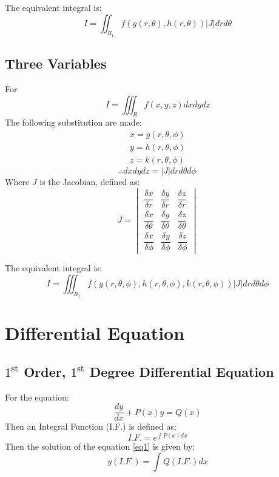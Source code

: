 \documentclass[openany, oneside]{book}
\begin{document}
The equivalent integral is:
\begin{equation}
I=\iint_{R_1} f(g(r,\theta),h(r,\theta))\lvert J \rvert drd\theta
\end{equation}

\section{Three Variables}
For
\begin{equation}
I=\iiint_R f(x,y,z) dxdydz
\end{equation}
The following substitution are made:
\begin{align}
x=g(r,\theta,\phi)\\
y=h(r,\theta,\phi)\\
z=k(r,\theta,\phi)
\end{align}
\begin{equation}
\therefore dx dy dz=\lvert J \rvert dr d\theta d\phi
\end{equation}
Where $J$ is the Jacobian, defined as:
\begin{equation}
J=\begin{vmatrix}
\dfrac{\delta x}{\delta r}&\dfrac{\delta y}{\delta r}&\dfrac{\delta z}{\delta r}\\
\dfrac{\delta x}{\delta \theta}&\dfrac{\delta y}{\delta \theta}&\dfrac{\delta z}{\delta \theta}\\
\dfrac{\delta x}{\delta \phi}&\dfrac{\delta y}{\delta \phi}&\dfrac{\delta z}{\delta \phi}
\end{vmatrix}
\end{equation}

The equivalent integral is:
\begin{equation}
I=\iiint_{R_1} f(g(r,\theta,\phi),h(r,\theta,\phi),k(r,\theta,\phi))\lvert J \rvert dr d\theta d\phi
\end{equation}

\large{\chapter{Differential Equation}}

\section{$1^\text{st}$ Order, $1^\text{st}$ Degree Differential Equation}
For the equation:
\begin{equation}
\dfrac{dy}{dx}+P(x)y=Q(x)\label{eq1}
\end{equation}
Then an Integral Function (I.F.) is defined as:
\begin{equation}
I.F.=e^{\int P(x)dx}
\end{equation}
Then the solution of the equation \ref{eq1} is given by:
\begin{equation}
y(I.F.)=\int Q (I.F.) dx
\end{equation}
\end{document}
